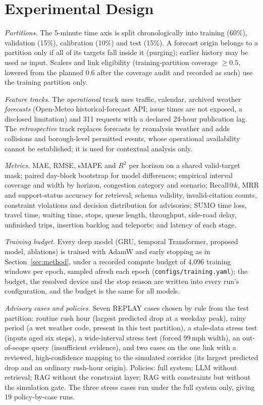\section{Experimental Design}
\textit{Partitions.} The 5-minute time axis is split chronologically into training (60\%), validation (15\%),
calibration (10\%) and test (15\%). A forecast origin belongs to a partition only if all of its targets fall inside it
(purging); earlier history may be used as input. Scalers and link eligibility (training-partition coverage $\ge 0.5$, lowered from the planned 0.6 after the coverage audit and recorded as such) use the
training partition only.

\textit{Feature tracks.} The \emph{operational} track uses traffic, calendar, archived weather \emph{forecasts}
(Open-Meteo historical-forecast API; issue times are not exposed, a disclosed limitation) and 311 requests with a declared
24-hour publication lag. The \emph{retrospective} track replaces forecasts by reanalysis weather and adds
collisions and borough-level permitted events, whose operational availability cannot be established; it is used for
contextual analysis only.

\textit{Metrics.} MAE, RMSE, sMAPE and $R^2$ per horizon on a shared valid-target mask; paired day-block bootstrap for
model differences; empirical interval coverage and width by horizon, congestion category and scenario; Recall@$k$, MRR and
support-status accuracy for retrieval; schema validity, invalid-citation counts, constraint violations and decision
distribution for advisories; SUMO time loss, travel time, waiting time, stops, queue length, throughput, side-road delay,
unfinished trips, insertion backlog and teleports; and latency of each stage.

\textit{Training budget.} Every deep model (GRU, temporal Transformer, proposed model, ablations) is trained with
AdamW and early stopping as in Section~\ref{sec:method}, under a recorded compute budget of 4{,}096 training windows
per epoch, sampled afresh each epoch (\texttt{configs/training.yaml}); the budget, the resolved device and the stop
reason are written into every run's configuration, and the budget is the same for all models.

\textit{Advisory cases and policies.} Seven REPLAY cases chosen by rule from the test partition: routine rush hour
(largest predicted drop at a weekday peak), rainy period (a wet weather code, present in this test partition), a
stale-data stress test (inputs aged six steps), a wide-interval stress test (forced 99\,mph width), an out-of-scope
query (insufficient evidence), and two cases on the one link with a reviewed, high-confidence mapping to the simulated
corridor (its largest predicted drop and an ordinary rush-hour origin). Policies: full system; LLM without retrieval;
RAG without the constraint layer; RAG with constraints but without the simulation gate. The three stress cases run
under the full system only, giving 19 policy-by-case runs.
